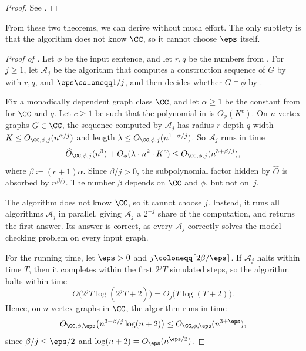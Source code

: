 
\begin{proof}
  See .
\end{proof}

From these two theorems, we can derive
 without much effort.
The only subtlety is that the algorithm does not know $\CC$, so it cannot choose $\eps$ itself.

\mainthm*

\begin{proof}[Proof of ]
  Let $\phi$ be the input sentence, and let $r,q$ be the numbers from .
  For $j\ge1$, let $\mathcal A_j$ be the algorithm that computes a construction sequence of $G$ by  with $r,q$, and $\eps\coloneqq1/j$,
  and then decides whether $G\models\phi$ by .

  Fix a monadically dependent graph class $\CC$, and let $\alpha\ge1$ be the constant from  for $\CC$ and $q$.
  Let $c\ge1$ be such that the polynomial in  is $O_\phi(K^c)$.
  On $n$-vertex graphs $G\in\CC$, the sequence computed by $\mathcal A_j$ has radius-$r$ depth-$q$ width $K\le O_{\CC,\phi,j}(n^{\alpha/j})$ and length $\lambda\le O_{\CC,\phi,j}(n^{1+\alpha/j})$.
  So $\mathcal A_j$ runs in time
  \[
    \widehat O_{\CC,\phi,j}(n^3)+O_\phi(\lambda\cdot n^2\cdot K^c)
    \le O_{\CC,\phi,j}(n^{3+\beta/j}),
  \]
  where $\beta\coloneqq(c+1)\alpha$.
  Since $\beta/j>0$, the subpolynomial factor hidden by $\widehat O$ is absorbed by $n^{\beta/j}$.
  The number $\beta$ depends on $\CC$ and $\phi$, but not on~$j$.

  The algorithm does not know $\CC$, so it cannot choose $j$.
  Instead, it runs all algorithms $\mathcal A_j$ in parallel, giving $\mathcal A_j$ a $2^{-j}$ share of the computation, and returns the first answer.
  Its answer is correct, as every $\mathcal A_j$ correctly solves the model checking problem on every input graph.

  For the running time, let $\eps>0$ and $j\coloneqq\lceil2\beta/\eps\rceil$.
  If $\mathcal A_j$ halts within time $T$, then it completes within the first $2^jT$ simulated steps, so the algorithm halts within time
  \[
    O\bigl(2^jT\log(2^jT+2)\bigr)=O_j\bigl(T\log(T+2)\bigr).
  \]
  Hence, on $n$-vertex graphs in $\CC$, the algorithm runs in time
  \[
    O_{\CC,\phi,\eps}\bigl(n^{3+\beta/j}\log(n+2)\bigr)
    \le O_{\CC,\phi,\eps}(n^{3+\eps}),
  \]
  since $\beta/j\le\eps/2$ and $\log(n+2)=O_\eps(n^{\eps/2})$.
\end{proof}

